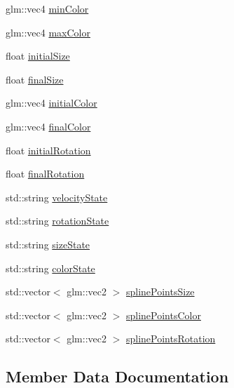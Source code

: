 \begin{DoxyCompactItemize}
glm\+::vec4 \hyperlink{class_mason_1_1_particle_descriptor_a86b3ee8f533d314ed0f0e48228144a25}{min\+Color}
\item 
glm\+::vec4 \hyperlink{class_mason_1_1_particle_descriptor_aa755ad8771cf25c71ec868e16cff41e2}{max\+Color}
\item 
float \hyperlink{class_mason_1_1_particle_descriptor_aebf2ee5b2a1b72e03e010d66a1ccf054}{initial\+Size}
\item 
float \hyperlink{class_mason_1_1_particle_descriptor_ad865ce5734085951e7c1ec384389ca4b}{final\+Size}
\item 
glm\+::vec4 \hyperlink{class_mason_1_1_particle_descriptor_a458d7ca5c19a0bbcf1c73796dbaf3597}{initial\+Color}
\item 
glm\+::vec4 \hyperlink{class_mason_1_1_particle_descriptor_a2b01be3725b46d1f4ef7a6775347be66}{final\+Color}
\item 
float \hyperlink{class_mason_1_1_particle_descriptor_a24f23bf106c1d0bf7dc676d16d64c6d7}{initial\+Rotation}
\item 
float \hyperlink{class_mason_1_1_particle_descriptor_ac588e3cd99709ae248547649b4a6643b}{final\+Rotation}
\item 
std\+::string \hyperlink{class_mason_1_1_particle_descriptor_ac84b802189304538944403fdff16faf2}{velocity\+State}
\item 
std\+::string \hyperlink{class_mason_1_1_particle_descriptor_ac192d2da527967c55804632bc6c0ca9e}{rotation\+State}
\item 
std\+::string \hyperlink{class_mason_1_1_particle_descriptor_a67edecae2a5df1c28ccc2f7cdb0a615f}{size\+State}
\item 
std\+::string \hyperlink{class_mason_1_1_particle_descriptor_aea9d3bf8cd0eaf89a9d34ca698062280}{color\+State}
\item 
std\+::vector$<$ glm\+::vec2 $>$ \hyperlink{class_mason_1_1_particle_descriptor_aefa11cd147ec20d3084c661245abb49c}{spline\+Points\+Size}
\item 
std\+::vector$<$ glm\+::vec2 $>$ \hyperlink{class_mason_1_1_particle_descriptor_a3a7588bd840bc8010f23bda75ec56e5d}{spline\+Points\+Color}
\item 
std\+::vector$<$ glm\+::vec2 $>$ \hyperlink{class_mason_1_1_particle_descriptor_aad86105e768cb5cf59c26d1277ccad2e}{spline\+Points\+Rotation}
\end{DoxyCompactItemize}


\subsection{Member Data Documentation}
\hypertarget{class_mason_1_1_particle_descriptor_aea9d3bf8cd0eaf89a9d34ca698062280}{}\label{class_mason_1_1_particle_descriptor_aea9d3bf8cd0eaf89a9d34ca698062280} 
